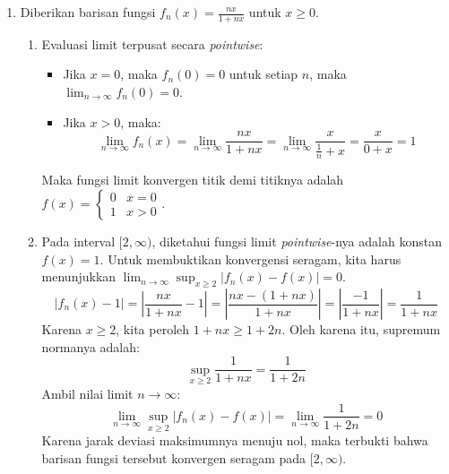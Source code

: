 \documentclass[11pt,letterpaper]{article}
\begin{document}
\begin{enumerate}
  \item Diberikan barisan fungsi $f_n(x) = \frac{nx}{1+nx}$ untuk $x \geq 0$.
        \begin{enumerate}[label=\alph*)]
          \item Evaluasi limit terpusat secara \textit{pointwise}:
                \begin{itemize}
                  \item Jika $x = 0$, maka $f_n(0) = 0$ untuk setiap $n$, maka $\lim_{n \to \infty} f_n(0) = 0$.
                  \item Jika $x > 0$, maka:
                        \[ \lim_{n \to \infty} f_n(x) = \lim_{n \to \infty} \frac{nx}{1+nx} = \lim_{n \to \infty} \frac{x}{\frac{1}{n} + x} = \frac{x}{0 + x} = 1 \]
                \end{itemize}
                Maka fungsi limit konvergen titik demi titiknya adalah $f(x) = \begin{cases} 0 & x = 0 \\ 1 & x > 0 \end{cases}$.
          \item Pada interval $[2, \infty)$, diketahui fungsi limit \textit{pointwise}-nya adalah konstan $f(x) = 1$. Untuk membuktikan konvergensi seragam, kita harus menunjukkan $\lim_{n \to \infty} \sup_{x \geq 2} |f_n(x) - f(x)| = 0$.
                \[ |f_n(x) - 1| = \left| \frac{nx}{1+nx} - 1 \right| = \left| \frac{nx - (1+nx)}{1+nx} \right| = \left| \frac{-1}{1+nx} \right| = \frac{1}{1+nx} \]
                Karena $x \geq 2$, kita peroleh $1+nx \geq 1+2n$.
                Oleh karena itu, supremum normanya adalah:
                \[ \sup_{x \geq 2} \frac{1}{1+nx} = \frac{1}{1+2n} \]
                Ambil nilai limit $n \to \infty$:
                \[ \lim_{n \to \infty} \sup_{x \geq 2} |f_n(x) - f(x)| = \lim_{n \to \infty} \frac{1}{1+2n} = 0 \]
                Karena jarak deviasi maksimumnya menuju nol, maka terbukti bahwa barisan fungsi tersebut konvergen seragam pada $[2, \infty)$.
        \end{enumerate}


\end{enumerate}
\end{document}
